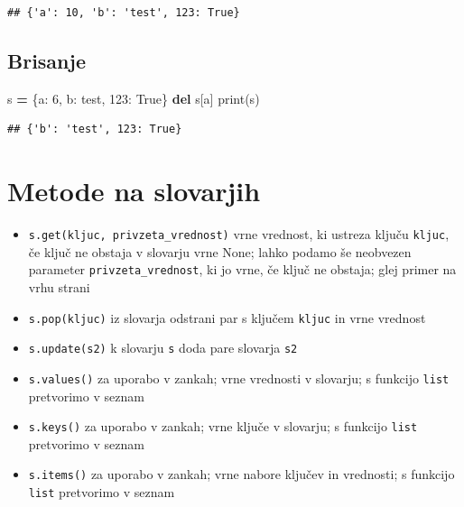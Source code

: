 \documentclass[
]{book}
\newenvironment{Shaded}{\begin{snugshade}}{\end{snugshade}}
\newcommand{\BuiltInTok}[1]{#1}
\newcommand{\DecValTok}[1]{\textcolor[rgb]{0.00,0.00,0.81}{#1}}
\newcommand{\KeywordTok}[1]{\textcolor[rgb]{0.13,0.29,0.53}{\textbf{#1}}}
\newcommand{\NormalTok}[1]{#1}
\newcommand{\OperatorTok}[1]{\textcolor[rgb]{0.81,0.36,0.00}{\textbf{#1}}}
\newcommand{\StringTok}[1]{\textcolor[rgb]{0.31,0.60,0.02}{#1}}
\newcommand{\VariableTok}[1]{\textcolor[rgb]{0.00,0.00,0.00}{#1}}
\providecommand{\tightlist}{%
  \setlength{\itemsep}{0pt}\setlength{\parskip}{0pt}}
\begin{document}
\begin{verbatim}
## {'a': 10, 'b': 'test', 123: True}
\end{verbatim}

\hypertarget{brisanje}{%
\subsection{Brisanje}\label{brisanje}}

\begin{Shaded}
\begin{Highlighting}[]
\NormalTok{s }\OperatorTok{=}\NormalTok{ \{}\StringTok{\textquotesingle{}a\textquotesingle{}}\NormalTok{: }\DecValTok{6}\NormalTok{, }\StringTok{\textquotesingle{}b\textquotesingle{}}\NormalTok{: }\StringTok{\textquotesingle{}test\textquotesingle{}}\NormalTok{, }\DecValTok{123}\NormalTok{: }\VariableTok{True}\NormalTok{\}}
\KeywordTok{del}\NormalTok{ s[}\StringTok{\textquotesingle{}a\textquotesingle{}}\NormalTok{]}
\BuiltInTok{print}\NormalTok{(s)}
\end{Highlighting}
\end{Shaded}

\begin{verbatim}
## {'b': 'test', 123: True}
\end{verbatim}

\hypertarget{metode-na-slovarjih}{%
\section{Metode na slovarjih}\label{metode-na-slovarjih}}

\begin{itemize}
\tightlist
\item
  \texttt{s.get(kljuc,\ privzeta\_vrednost)} vrne vrednost, ki ustreza ključu \texttt{kljuc}, če ključ ne obstaja v slovarju vrne None; lahko podamo še neobvezen parameter \texttt{privzeta\_vrednost}, ki jo vrne, če ključ ne obstaja; glej primer na vrhu strani
\item
  \texttt{s.pop(kljuc)} iz slovarja odstrani par s ključem \texttt{kljuc} in vrne vrednost
\item
  \texttt{s.update(s2)} k slovarju \texttt{s} doda pare slovarja \texttt{s2}
\item
  \texttt{s.values()} za uporabo v zankah; vrne vrednosti v slovarju; s funkcijo \texttt{list} pretvorimo v seznam
\item
  \texttt{s.keys()} za uporabo v zankah; vrne ključe v slovarju; s funkcijo \texttt{list} pretvorimo v seznam
\item
  \texttt{s.items()} za uporabo v zankah; vrne nabore ključev in vrednosti; s funkcijo \texttt{list} pretvorimo v seznam
\end{itemize}
\end{document}

